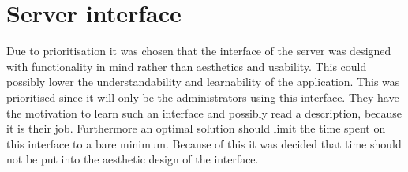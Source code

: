 \section{Server interface}\label{sec:serverInterface}
Due to prioritisation it was chosen that the interface of the server was designed with functionality in mind rather than aesthetics and usability. This could possibly lower the understandability and learnability of the application. This was prioritised since it will only be the administrators using this interface. They have the motivation to learn such an interface and possibly read a description, because it is their job. Furthermore an optimal solution should limit the time spent on this interface to a bare minimum. Because of this it was decided that time should not be put into the aesthetic design of the interface.